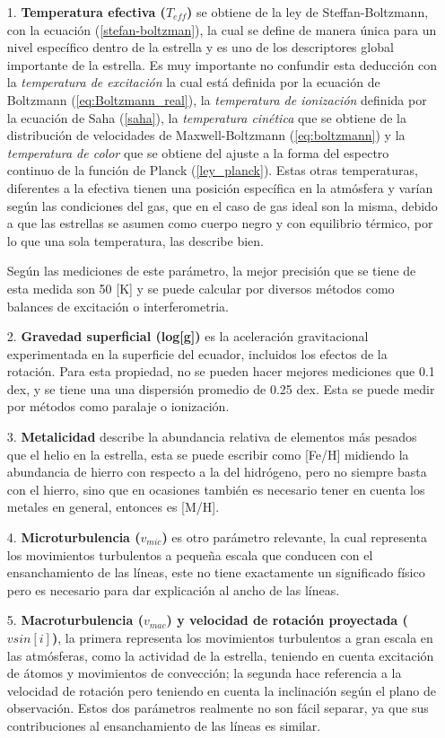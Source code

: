 \documentclass[12pt,oneside,openany,letter]{book}
\begin{document}
\begin{itemize}
    \item[1.] \textbf{Temperatura efectiva ($T_{eff}$)}  se obtiene de la ley de Steffan-Boltzmann, con la ecuación (\ref{stefan-boltzman}), la cual se define de manera única para un nivel específico dentro de la estrella y es uno de los descriptores global importante de la estrella. Es muy importante no confundir esta deducción con la \textit{temperatura de excitación} la cual está definida por la ecuación de Boltzmann (\ref{eq:Boltzmann_real}), la \textit{temperatura de ionización} definida por la ecuación de Saha (\ref{saha}), la \textit{temperatura cinética} que se obtiene de la distribución de velocidades de Maxwell-Boltzmann (\ref{eq:boltzmann}) y la \textit{temperatura de color} que se obtiene del ajuste a la forma del espectro continuo de la función de Planck (\ref{ley_planck}). Estas otras temperaturas, diferentes a la efectiva tienen una posición específica en la atmósfera y varían según las condiciones del gas, que en el caso de gas ideal son la misma, debido a que las estrellas se asumen como cuerpo negro y con equilibrio térmico, por lo que una sola temperatura, las describe bien.
    
    \noindent Según las mediciones de este parámetro, la mejor precisión que se tiene de esta medida son 50 [K] y se puede calcular por diversos métodos como balances de excitación o interferometria.
    
    \item[2.] \textbf{Gravedad superficial (log[g])} es la aceleración gravitacional experimentada en la superficie del ecuador, incluidos los efectos de la rotación. Para esta propiedad, no se pueden hacer mejores mediciones que 0.1 dex, y se tiene una una dispersión promedio de 0.25 dex. Esta se puede medir por métodos como paralaje o ionización. 
    
    \item[3.] \textbf{Metalicidad} describe la abundancia relativa de elementos más pesados que el helio en la estrella, esta se puede escribir como [Fe/H] midiendo la abundancia de hierro con respecto a la del hidrógeno, pero no siempre basta con el hierro, sino que en ocasiones también es necesario tener en cuenta los metales en general, entonces es [M/H].

    \item[4.] \textbf{Microturbulencia ($v_{mic}$)} es otro parámetro relevante, la cual representa los movimientos turbulentos a pequeña escala que conducen con el ensanchamiento de las líneas, este no tiene exactamente un significado físico pero es necesario para dar explicación al ancho de las líneas.
    \item[5.] \textbf{Macroturbulencia ($v_{mac}$) y velocidad de rotación proyectada ($v sin[i]$)}, la  primera representa los movimientos turbulentos a gran escala en las atmósferas, como la actividad de la estrella, teniendo en cuenta excitación de átomos y movimientos de convección; la segunda hace referencia a la velocidad de rotación pero teniendo en cuenta la inclinación según el plano de observación. Estos dos parámetros realmente no son fácil separar, ya que sus contribuciones al ensanchamiento de las líneas es similar.
\end{itemize}
\end{document}
